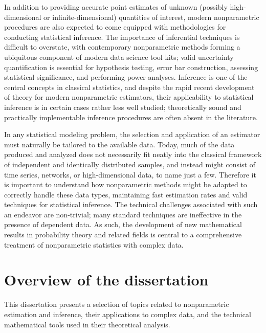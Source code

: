 In addition to providing accurate point estimates of unknown
(possibly high-dimensional or infinite-dimensional) quantities of interest,
modern nonparametric procedures are also expected to come equipped
with methodologies for conducting statistical inference.
The importance of inferential techniques is difficult to overstate,
with contemporary nonparametric methods forming a ubiquitous
component of modern data science tool kits;
valid uncertainty quantification is essential for hypothesis testing,
error bar construction, assessing statistical significance, and
performing power analyses. Inference is one of the central concepts in
classical statistics, and despite the rapid recent development of theory for
modern nonparametric estimators, their applicability to
statistical inference is in certain cases rather less well studied;
theoretically sound and practically implementable
inference procedures are often absent in the literature.

In any statistical modeling problem, the selection and application
of an estimator must
naturally be tailored to the available data. Today, much of the data produced
and analyzed does not necessarily
fit neatly into the classical framework of independent
and identically distributed samples, and instead might consist of time series,
networks, or high-dimensional data, to name just a few. Therefore it is
important to understand how nonparametric methods might be adapted to correctly
handle these data types, maintaining fast estimation rates and valid techniques
for statistical inference.
The technical challenges associated with such an endeavor are non-trivial;
many standard techniques are ineffective in the presence of
dependent data. As such, the development of new
mathematical results in probability theory and related fields
is central to a comprehensive
treatment of nonparametric statistics with complex data.

\section*{Overview of the dissertation}

This dissertation presents a selection of topics related to nonparametric
estimation and inference, their applications to complex data, and the
technical mathematical tools used in their theoretical analysis.

